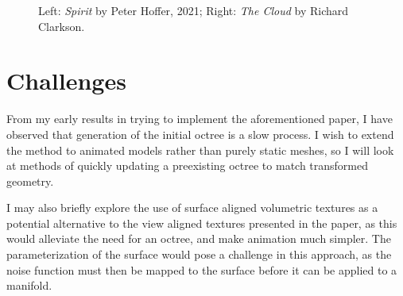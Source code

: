 \documentclass{article}
\begin{document}
\begin{figure}[h]
\caption{Left: \textit{Spirit}\cite{spirit} by Peter Hoffer, 2021; Right: \textit{The Cloud}\cite{thecloud} by Richard Clarkson.}
\end{figure}

\newpage{}

\section{Challenges}

From my early results in trying to implement the aforementioned paper, I have observed that generation of the initial octree is a slow process. I wish to extend the method to animated models rather than purely static meshes, so I will look at methods of quickly updating a preexisting octree to match transformed geometry.

I may also briefly explore the use of surface aligned volumetric textures as a potential alternative to the view aligned textures presented in the paper, as this would alleviate the need for an octree, and make animation much simpler. The parameterization of the surface would pose a challenge in this approach, as the noise function must then be mapped to the surface before it can be applied to a manifold.
\end{document}
